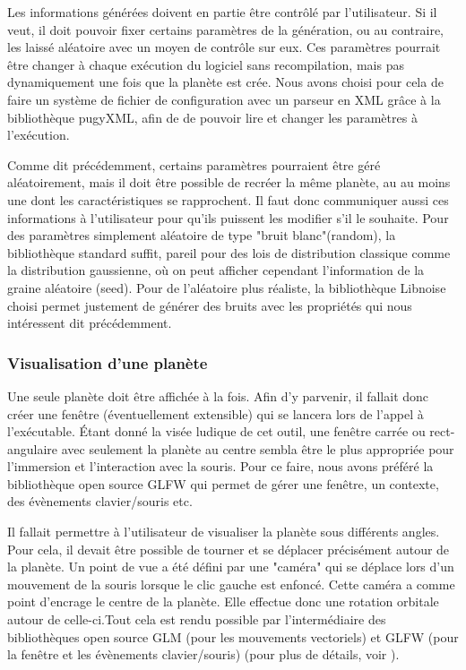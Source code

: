 \documentclass[a4paper]{article}
\begin{document}
\label{besoin_paramètres}
Les informations générées doivent en partie être contrôlé par l'utilisateur. Si il veut, il doit pouvoir fixer certains paramètres de la génération, ou au contraire, les laissé aléatoire avec un moyen de contrôle sur eux. Ces paramètres pourrait être changer à chaque exécution du logiciel sans recompilation, mais pas dynamiquement une fois que la planète est crée. Nous avons choisi pour cela de faire un système de fichier de configuration avec un parseur en XML grâce à la bibliothèque pugyXML, afin de de pouvoir lire et changer les paramètres à l'exécution.

\label{besoin_aleatory}
Comme dit précédemment, certains paramètres pourraient être géré aléatoirement, mais il doit être possible de recréer la même planète, au au moins une dont les caractéristiques se rapprochent.
Il faut donc communiquer aussi ces informations à l'utilisateur pour qu'ils puissent les modifier s'il le souhaite. 
Pour des paramètres simplement aléatoire de type "bruit blanc"(random), la bibliothèque standard suffit, pareil pour des lois de distribution classique comme la distribution gaussienne, où on peut afficher cependant l'information de la graine aléatoire (seed). Pour de l'aléatoire plus réaliste, la bibliothèque Libnoise choisi permet justement de générer des bruits avec les propriétés qui nous intéressent dit précédemment.

\subsubsection{Visualisation d'une planète}

Une seule planète doit être affichée à la fois.  Afin d’y parvenir, il fallait donc créer une fenêtre (éventuellement extensible) qui se lancera lors de l’appel à l’exécutable. Étant donné la visée ludique de cet outil, une fenêtre carrée ou rect-angulaire avec seulement la planète au centre sembla être le plus appropriée pour l’immersion et l’interaction avec la souris. Pour ce faire, nous avons préféré la bibliothèque open source GLFW qui permet de gérer une fenêtre, un contexte, des évènements clavier/souris etc.

Il fallait permettre à l’utilisateur de visualiser la planète sous différents angles. Pour cela, il devait être possible de tourner et se déplacer  précisément autour de la planète. Un point de vue a été défini par une "caméra" qui se déplace lors d’un mouvement de la souris lorsque le clic gauche est enfoncé. Cette caméra a comme point d’encrage le centre de la planète. Elle effectue donc une rotation orbitale autour de celle-ci.Tout cela est rendu possible par l’intermédiaire des bibliothèques open source GLM (pour les mouvements vectoriels) %
et GLFW (pour la fenêtre et les évènements clavier/souris) (pour plus de détails, voir \cite{TutoCamera}).
\end{document}
